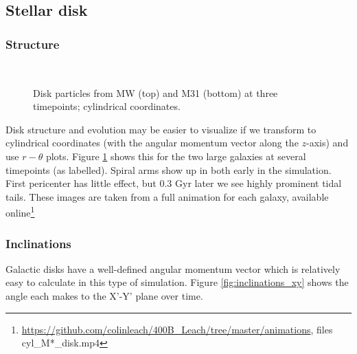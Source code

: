 \documentclass[twocolumn]{aastex63}
\newcommand{\todo}{\color{red}{TODO}\color{black}\hspace{2mm}}
\begin{document}

\subsection{Stellar disk}

\subsubsection{Structure}

\todo{identify the bar?}\ 

\todo{more on spiral arms}


\begin{figure}[!bht!]
	\caption{Disk particles from MW (top) and M31 (bottom) at three timepoints; cylindrical coordinates.
		\label{fig:6cyl}}
\end{figure}

Disk structure and evolution may be easier to visualize if we transform to cylindrical coordinates (with the angular momentum vector along the $z$-axis) and use $r-\theta$ plots. Figure \ref{fig:6cyl} shows this for the two large galaxies at several timepoints (as labelled).  Spiral arms show up in both early in the simulation. First pericenter has little effect, but 0.3 Gyr later we see highly prominent tidal tails. These images are taken from a full animation for each galaxy, available online\footnote{\url{https://github.com/colinleach/400B_Leach/tree/master/animations}, files cyl\_M*\_disk.mp4 }

\subsubsection{Inclinations}

Galactic disks have a well-defined angular momentum vector which is relatively easy to calculate in this type of simulation. Figure \ref{fig:inclinations_xy} shows the angle each makes to the X'-Y' plane over time.
\end{document}
